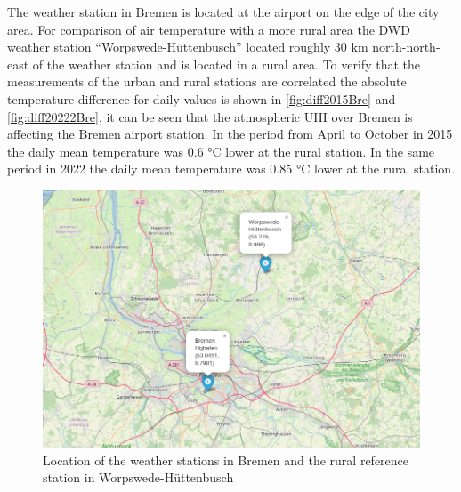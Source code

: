 \documentclass[12pt,a4paper, english,twoside]{scrartcl}
\begin{document}
      The weather station in Bremen is located at the airport on the edge of the city area. %
      For comparison of air temperature with a more rural area the \gls{DWD} weather station ``Worpswede-Hüttenbusch'' located roughly 30 km north-north-east of the weather station and is located in a rural area. 
      To verify that the measurements of the urban and rural stations are correlated the absolute temperature difference for daily values is shown in \cref{fig:diff2015Bre} and \cref{fig:diff20222Bre}, it can be seen that the atmospheric \gls{UHI} over Bremen is affecting the Bremen airport station. 
      In the period from April to October in 2015 the daily mean temperature was 0.6 °C lower at the rural station. 
      In the same period in 2022 the daily mean temperature was 0.85 °C lower at the rural station. 
      \begin{figure}[!htbp]
         \centering
            \includegraphics[width=\textwidth]{img/MapWetterstationenBremen.jpeg}
             \caption{Location of the weather stations in Bremen and the rural reference station in Worpswede-Hüttenbusch}\label{fig:mapWeatherstationsBremen}
      \end{figure}
\end{document}
